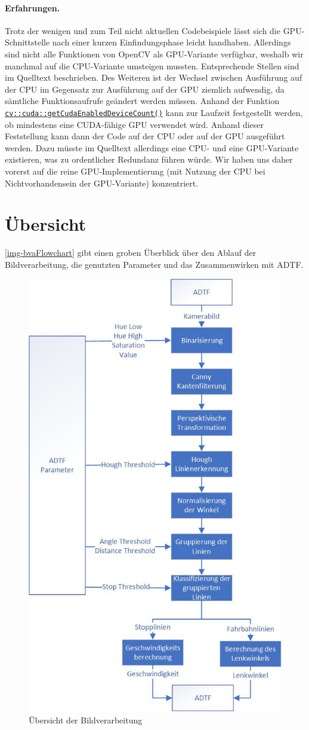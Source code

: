 \documentclass[a4paper,12pt]{report}
\begin{document}
	\paragraph{Erfahrungen.}
	Trotz der wenigen und zum Teil nicht aktuellen Codebeispiele lässt sich die GPU-Schnittstelle nach einer kurzen Einfindungsphase leicht handhaben.
	Allerdings sind nicht alle Funktionen von OpenCV als GPU-Variante verfügbar, weshalb wir manchmal auf die CPU-Variante umsteigen mussten. Entsprechende Stellen sind im Quelltext beschrieben. Des Weiteren ist der Wechsel zwischen Ausführung auf der CPU im Gegensatz zur Ausführung auf der GPU ziemlich aufwendig, da sämtliche Funktionsaufrufe geändert werden müssen.
	Anhand der Funktion \href{https://docs.opencv.org/3.4.0/d8/d40/group\_\_cudacore\_\_init.html\#gaaa93892f9189163e5d53790b4b1e88db}{\texttt{cv::cuda::getCudaEnabled\-DeviceCount()}} \cite{opencv-doc} kann zur Laufzeit festgestellt werden, ob mindestens eine CUDA-fähige GPU verwendet wird.
	Anhand dieser Feststellung kann dann der Code auf der CPU oder auf der GPU ausgeführt werden.
	Dazu müsste im Quelltext allerdings eine CPU- und eine GPU-Variante existieren, was zu ordentlicher Redundanz führen würde.
	Wir haben uns daher vorerst auf die reine GPU-Implementierung (mit Nutzung der CPU bei Nichtvorhandensein der GPU-Variante) konzentriert.

\pagebreak

\section{Übersicht}
	\autoref{img-bvaFlowchart} gibt einen groben Überblick über den Ablauf der Bildverarbeitung, die genutzten Parameter und das Zusammenwirken mit ADTF.

	\begin{figure}[ht]
		\centering
		\includegraphics[width=.6\textwidth,keepaspectratio]{assets/bvaFlowchart.jpg}
		\caption{Übersicht der Bildverarbeitung}
		\label{img-bvaFlowchart}
	\end{figure}
\end{document}
